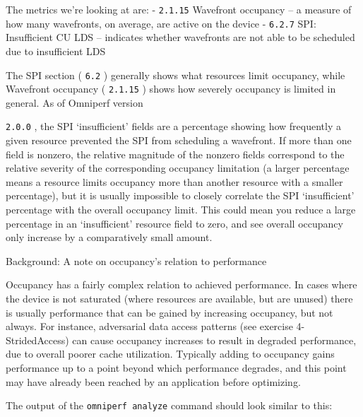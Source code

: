 \documentclass[
]{article}
\let\oldtexttt\texttt
\renewcommand{\texttt}[1]{
  \colorbox{Light}{\oldtexttt{#1}}
}
\begin{document}
The metrics we're looking at are: - \texttt{2.1.15} Wavefront occupancy
-- a measure of how many wavefronts, on average, are active on the
device - \texttt{6.2.7} SPI: Insufficient CU LDS -- indicates whether
wavefronts are not able to be scheduled due to insufficient LDS

The SPI section (\texttt{6.2}) generally shows what resources limit
occupancy, while Wavefront occupancy (\texttt{2.1.15}) shows how
severely occupancy is limited in general. As of Omniperf version
\texttt{2.0.0}, the SPI `insufficient' fields are a percentage showing
how frequently a given resource prevented the SPI from scheduling a
wavefront. If more than one field is nonzero, the relative magnitude of
the nonzero fields correspond to the relative severity of the
corresponding occupancy limitation (a larger percentage means a resource
limits occupancy more than another resource with a smaller percentage),
but it is usually impossible to closely correlate the SPI `insufficient'
percentage with the overall occupancy limit. This could mean you reduce
a large percentage in an `insufficient' resource field to zero, and see
overall occupancy only increase by a comparatively small amount.

Background: A note on occupancy's relation to performance

Occupancy has a fairly complex relation to achieved performance. In
cases where the device is not saturated (where resources are available,
but are unused) there is usually performance that can be gained by
increasing occupancy, but not always. For instance, adversarial data
access patterns (see exercise 4-StridedAccess) can cause occupancy
increases to result in degraded performance, due to overall poorer cache
utilization. Typically adding to occupancy gains performance up to a
point beyond which performance degrades, and this point may have already
been reached by an application before optimizing.

The output of the \texttt{omniperf\ analyze} command should look similar
to this:
\end{document}
